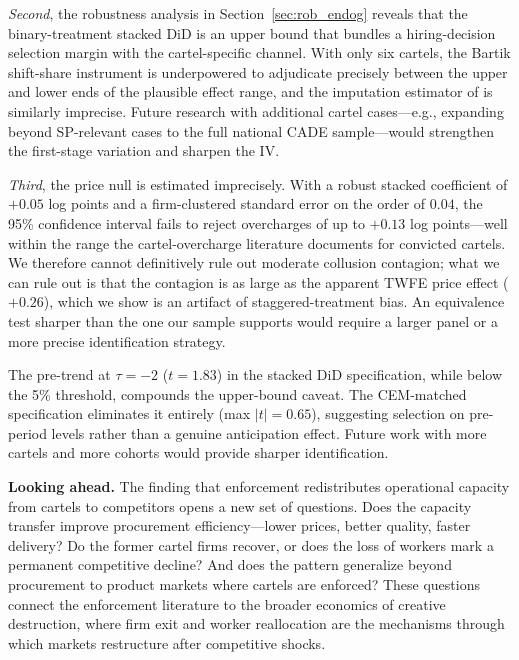 \emph{Second}, the robustness analysis in Section~\ref{sec:rob_endog} reveals that the binary-treatment stacked DiD is an upper bound that bundles a hiring-decision selection margin with the cartel-specific channel. With only six cartels, the Bartik shift-share instrument is underpowered to adjudicate precisely between the upper and lower ends of the plausible effect range, and the imputation estimator of \citet{borusyak2024revisiting} is similarly imprecise. Future research with additional cartel cases---e.g., expanding beyond SP-relevant cases to the full national CADE sample---would strengthen the first-stage variation and sharpen the IV.

\emph{Third}, the price null is estimated imprecisely. With a robust stacked coefficient of $+0.05$ log points and a firm-clustered standard error on the order of $0.04$, the 95\% confidence interval fails to reject overcharges of up to $+0.13$ log points---well within the range the cartel-overcharge literature documents for convicted cartels. We therefore cannot definitively rule out moderate collusion contagion; what we can rule out is that the contagion is as large as the apparent TWFE price effect ($+0.26$), which we show is an artifact of staggered-treatment bias. An equivalence test sharper than the one our sample supports would require a larger panel or a more precise identification strategy.

The pre-trend at $\tau = -2$ ($t = 1.83$) in the stacked DiD specification, while below the 5\% threshold, compounds the upper-bound caveat. The CEM-matched specification eliminates it entirely (max $|t| = 0.65$), suggesting selection on pre-period levels rather than a genuine anticipation effect. Future work with more cartels and more cohorts would provide sharper identification.

\noindent\textbf{Looking ahead.} The finding that enforcement redistributes operational capacity from cartels to competitors opens a new set of questions. Does the capacity transfer improve procurement efficiency---lower prices, better quality, faster delivery? Do the former cartel firms recover, or does the loss of workers mark a permanent competitive decline? And does the pattern generalize beyond procurement to product markets where cartels are enforced? These questions connect the enforcement literature to the broader economics of creative destruction, where firm exit and worker reallocation are the mechanisms through which markets restructure after competitive shocks.
